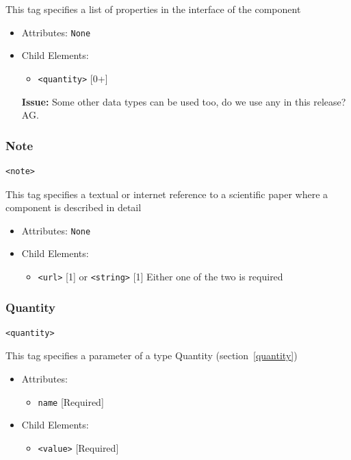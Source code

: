 \documentclass{article}
\newcommand{\issue}[1]{%
\begin{center}
\colorbox{issuecolor}{\parbox{0.8\linewidth}{\textbf{Issue:} #1}}
\end{center}%
}
\begin{document}
This tag specifies a list of properties in the interface of the component

\begin{itemize}
\item Attributes: \texttt{None}

\item Child Elements:
%
\begin{itemize}
\item \verb|<quantity>| {[}0+{]}
\end{itemize}

\issue{Some other data types can be used too, do we use any in this release?
AG.}

\end{itemize}

\subsubsection{Note}
%
\begin{lstlisting}
<note>
\end{lstlisting}

This tag specifies a textual or internet reference to a scientific paper where
a component is described in detail

\begin{itemize}
\item Attributes: \texttt{None}

\item Child Elements:
%
\begin{itemize}
\item \verb|<url>| {[}1{]} or \verb|<string>| {[}1{]} Either one
of the two is required
\end{itemize}

\end{itemize}

\subsubsection{Quantity}
%
\begin{lstlisting}
<quantity>
\end{lstlisting}

This tag specifies a parameter of a type Quantity (section~\ref{quantity})

\begin{itemize}
\item Attributes:
%
\begin{itemize}
\item \verb|name| {[}Required{]}
\end{itemize}


\item Child Elements:
%
\begin{itemize}
\item \verb|<value>| {[}Required{]}
\end{itemize}

\end{itemize}
\end{document}
